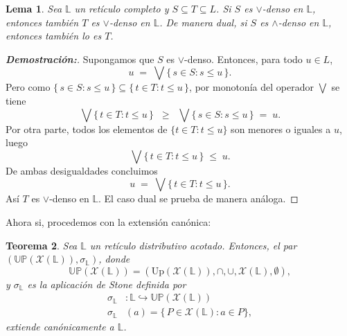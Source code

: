 \documentclass[12pt]{book}
\newtheorem{theorem}{Teorema}[section]
\newtheorem{lemma}[theorem]{Lema}
\newcommand{\Up}{\mathbb{UP}}
\begin{document}
\begin{lemma}\label{lem:densidad-heredada}
Sea $\mathbb L$ un retículo completo y $S\subseteq T\subseteq L$. 
Si $S$ es $\vee$-denso en $\mathbb L$, entonces también $T$ es $\vee$-denso en $\mathbb L$. 
De manera dual, si $S$ es $\wedge$-denso en $\mathbb L$, entonces también lo es $T$. 
\end{lemma}

\begin{proof}[\textbf{Demostración:}]
Supongamos que $S$ es $\vee$-denso. Entonces, para todo $u\in L$,
\[
u \;=\; \bigvee\{\,s\in S : s\le u\,\}.
\]
Pero como $\{\,s\in S : s\le u\,\}\subseteq \{\,t\in T : t\le u\,\}$, por
monotonía del operador $\bigvee$ se tiene
\[
\bigvee\{\,t\in T : t\le u\,\}
\;\;\ge\;\;
\bigvee\{\,s\in S : s\le u\,\}
\;=\; u.
\]
Por otra parte, todos los elementos de $\{t\in T : t\le u\}$ son menores o iguales a $u$, luego
\[
\bigvee\{\,t\in T : t\le u\,\}\;\le\; u.
\]
De ambas desigualdades concluimos
\[
u \;=\; \bigvee\{\,t\in T : t\le u\,\}.
\]
Así $T$ es $\vee$-denso en $\mathbb L$. El caso dual se prueba de manera análoga.
\end{proof}


Ahora si, procedemos con la extensión canónica:
\begin{theorem}\label{teo:ext-canonica-sigma}
Sea $\mathbb{L}$ un retículo distributivo acotado. Entonces, el par $\left(\Up(\mathcal{X}(\mathbb{L})),\sigma_{\mathbb{L}} \right)$, donde
\[ \Up(\mathcal{X}(\mathbb{L})) = \left(\mathrm{Up}(\mathcal X(\mathbb L)),\cap,\cup,\mathcal X(\mathbb L),\emptyset \right), \]
y $\sigma_{\mathbb{L}}$ es la aplicación de Stone definida por  
\begin{align*}
  \sigma_{\mathbb{L}}&\colon \mathbb{L}\hookrightarrow\Up(\mathcal{X}(\mathbb{L}))\\
  \sigma_{\mathbb{L}}&(a)=\{\,P\in\mathcal{X}(\mathbb{L}):a\in P\},
\end{align*}
extiende canónicamente a \(\mathbb{L}\).
\end{theorem}
\end{document}
